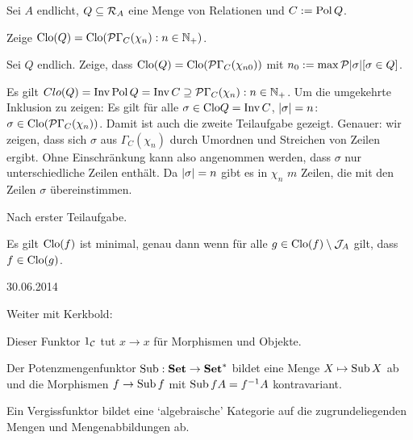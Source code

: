 \documentclass{book}
\begin{document}
\begin{exercise}
    Sei $A$ endlicht, $Q\subseteq \mathcal{R}_A$ eine Menge von Relationen und $C:=\mathop\mathrm{Pol} Q$.
    \begin{tasks}
            \item Zeige $\Clo(Q)=\Clo(\set{\Gamma_C(\chi_n):n\in\nats_+})$.
        \item Sei $Q$ endlich. Zeige, dass $\Clo(Q)=\Clo(\set{\Gamma_C(\chi_{n0})})$ mit $n_0:=\max\set{\card\sigma}[\sigma\in Q]$.
    \end{tasks}
\end{exercise}

\begin{solution}
    \begin{tasks}
            \item Es gilt $Clo(Q)=\Inv\Pol Q=\Inv C\setgeq \set{\Gamma_C(\chi_n):n\in\nats_+}$. Um die umgekehrte Inklusion zu zeigen: Es gilt für alle $\sigma\in\mathrm{Clo} Q=\mathop\mathrm{Inv} C$, $\left|\sigma\right|=n$: $\sigma\in\Clo(\set{\Gamma_C(\chi_n)})$. Damit ist auch die zweite Teilaufgabe gezeigt.
        Genauer: wir zeigen, dass sich $\sigma$ aus $\Gamma_C(\chi_n)$ durch Umordnen und Streichen von Zeilen ergibt. Ohne Einschränkung kann also angenommen werden, dass $\sigma$ nur unterschiedliche Zeilen enthält. Da $\left|\sigma\right|=n$ gibt es in $\chi_n$ $m$ Zeilen, die mit den Zeilen $\sigma$ übereinstimmen.
        \item Nach erster Teilaufgabe.
    \end{tasks}
\end{solution}

\begin{remark}
    Es gilt $\mathrm{Clo}(f)$ ist minimal, genau dann wenn für alle $g\in\mathrm{Clo}(f)\setminus\mathcal{J}_A$ gilt, dass $f\in\mathrm{Clo}(g)$. 
\end{remark}

\hfill{30.06.2014}

Weiter mit Kerkbold:

\begin{example}[Identitätsfunktor]
    Dieser Funktor $1_{\mathcal{C}}$ tut $x\to x$ für Morphismen und Objekte.    
\end{example}

\begin{example}[Potenzmengenfunktor]
    Der Potenzmengenfunktor $\mathop\mathrm{Sub}\nolimits:\mathbf{Set}\rightarrow\mathbf{Set}^{\ast}$ bildet eine Menge $X\mapsto\mathop\mathrm{Sub}\nolimits X$ ab und die Morphismen $f\rightarrow \mathop\mathrm{Sub}\nolimits f$ mit $\mathop\mathrm{Sub}\nolimits f A = f^{-1} A$ kontravariant.
\end{example}

\begin{example}[Vergissfunktor]
    Ein Vergissfunktor bildet eine `algebraische' Kategorie auf die zugrundeliegenden Mengen und Mengenabbildungen ab.
\end{example}
\end{document}
